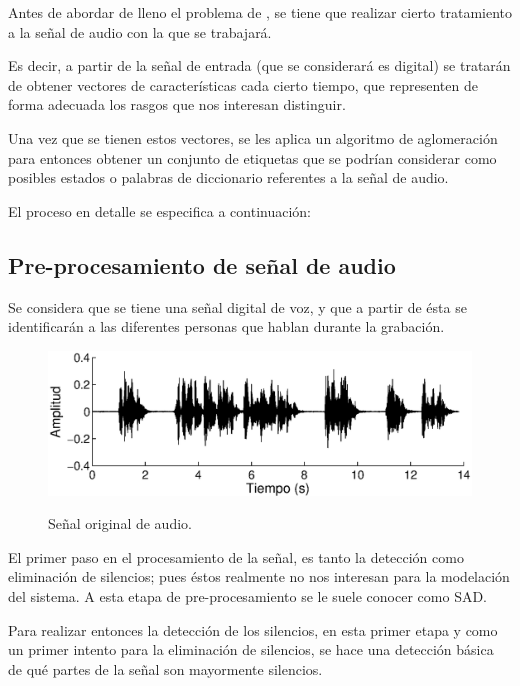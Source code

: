 Antes de abordar de lleno el problema de \sd, se tiene que realizar cierto tratamiento a la señal de audio con la que se trabajará. 

Es decir, a partir de la señal de entrada (que se considerará es digital) se tratarán de obtener vectores de características cada cierto tiempo, que representen de forma adecuada los rasgos que nos interesan distinguir.

Una vez que se tienen estos vectores, se les aplica un algoritmo de aglomeración para entonces obtener un conjunto de etiquetas que se podrían considerar como posibles estados o palabras de diccionario referentes a la señal de audio.

El proceso en detalle se especifica a continuación: 

\subsection{Pre-procesamiento de señal de audio}

Se considera que se tiene una señal digital de voz, y que a partir de ésta se identificarán a las diferentes personas que hablan durante la grabación.

\begin{figure}[ht]
  {\includegraphics[width=0.9\linewidth]{gfx/chap2/signal0}} \quad
  \caption{Señal original de audio.}
  \label{fig:sign_orig}
\end{figure}

El primer paso en el procesamiento de la señal, es tanto la detección como eliminación de silencios; pues éstos realmente no nos interesan para la modelación del sistema. A esta etapa de pre-procesamiento se le suele conocer como \ac{SAD}.


Para realizar entonces la detección de los silencios, en esta primer etapa y como un primer intento para la eliminación de silencios, se hace una detección básica de qué partes de la señal son mayormente silencios.

